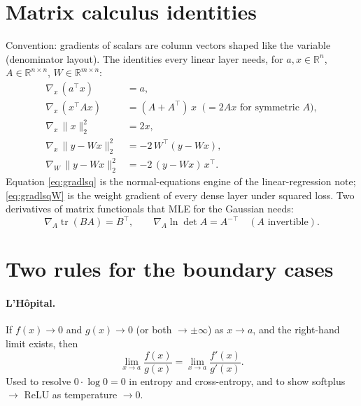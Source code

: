\documentclass[11pt]{article}
\begin{document}
\section{Matrix calculus identities}

Convention: gradients of scalars are column vectors shaped like the
variable (denominator layout). The identities every linear layer needs,
for $a, x \in \mathbb{R}^n$, $A \in \mathbb{R}^{n\times n}$,
$W \in \mathbb{R}^{m\times n}$:
\begin{align}
  \nabla_x \,(a^{\top}x) &= a,
  \label{eq:gradlinear}\\[2pt]
  \nabla_x \,(x^{\top}Ax) &= (A + A^{\top})\,x
  \;\;\bigl(= 2Ax \text{ for symmetric } A\bigr),
  \label{eq:gradquad}\\[2pt]
  \nabla_x \,\lVert x \rVert_2^2 &= 2x,
  \label{eq:gradnorm}\\[2pt]
  \nabla_x\,\lVert y - Wx \rVert_2^2 &= -2\,W^{\top}(y - Wx),
  \label{eq:gradlsq}\\[2pt]
  \nabla_W\,\lVert y - Wx \rVert_2^2 &= -2\,(y - Wx)\,x^{\top}.
  \label{eq:gradlsqW}
\end{align}
Equation \eqref{eq:gradlsq} is the normal-equations engine of the
linear-regression note; \eqref{eq:gradlsqW} is the weight gradient of
every dense layer under squared loss. Two derivatives of matrix
functionals that MLE for the Gaussian needs:
\begin{equation}
  \nabla_A \operatorname{tr}(BA) = B^{\top},
  \qquad
  \nabla_A \ln\det A = A^{-\top}
  \quad (A \text{ invertible}).
  \label{eq:matfunc}
\end{equation}

\section{Two rules for the boundary cases}

\paragraph{L'H\^opital.} If $f(x) \to 0$ and $g(x) \to 0$ (or both
$\to \pm\infty$) as $x \to a$, and the right-hand limit exists, then
\begin{equation}
  \lim_{x\to a} \frac{f(x)}{g(x)} = \lim_{x\to a} \frac{f'(x)}{g'(x)}.
  \label{eq:lhopital}
\end{equation}
Used to resolve $0 \cdot \log 0 = 0$ in entropy and cross-entropy, and
to show softplus $\to$ ReLU as temperature $\to 0$.
\end{document}
